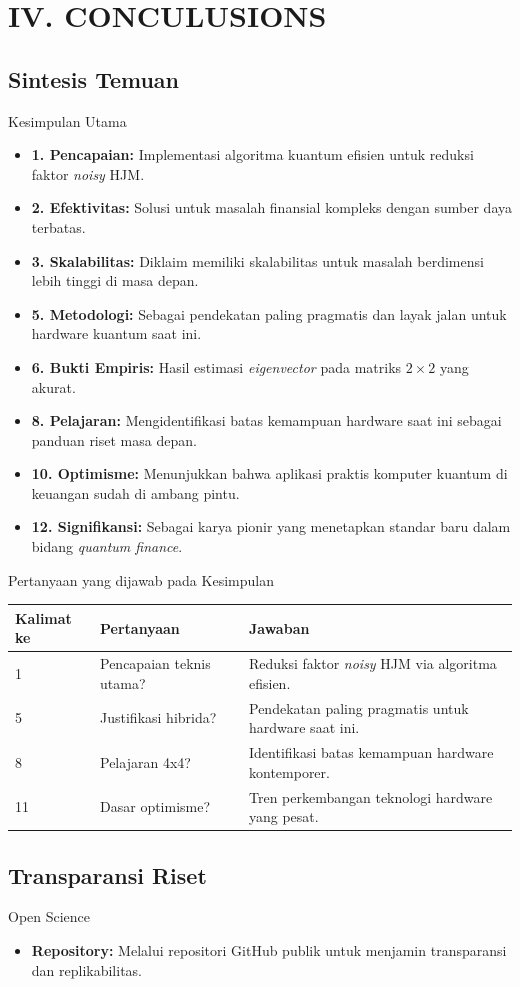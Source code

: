 \section{IV. CONCULUSIONS}

\subsection{Sintesis Temuan}
\begin{frame}{Kesimpulan Utama}
    \begin{itemize}
        \item \textbf{1. Pencapaian:} Implementasi algoritma kuantum efisien untuk reduksi faktor \textit{noisy} HJM.
        \item \textbf{2. Efektivitas:} Solusi untuk masalah finansial kompleks dengan sumber daya terbatas.
        \item \textbf{3. Skalabilitas:} Diklaim memiliki skalabilitas untuk masalah berdimensi lebih tinggi di masa depan.
        \item \textbf{5. Metodologi:} Sebagai pendekatan paling pragmatis dan layak jalan untuk hardware kuantum saat ini.
        \item \textbf{6. Bukti Empiris:} Hasil estimasi \textit{eigenvector} pada matriks $2 \times 2$ yang akurat.
        \item \textbf{8. Pelajaran:} Mengidentifikasi batas kemampuan hardware saat ini sebagai panduan riset masa depan.
        \item \textbf{10. Optimisme:} Menunjukkan bahwa aplikasi praktis komputer kuantum di keuangan sudah di ambang pintu.
        \item \textbf{12. Signifikansi:} Sebagai karya pionir yang menetapkan standar baru dalam bidang \textit{quantum finance}.
    \end{itemize}
\end{frame}

\begin{frame}{Pertanyaan yang dijawab pada Kesimpulan}
    \centering
    \small
    \begin{tabular}{lp{4.5cm}p{6cm}}
        \toprule
        Kalimat ke & Pertanyaan & Jawaban \\
        \midrule
        1 & Pencapaian teknis utama? & Reduksi faktor \textit{noisy} HJM via algoritma efisien. \\
        5 & Justifikasi hibrida? & Pendekatan paling pragmatis untuk hardware saat ini. \\
        8 & Pelajaran 4x4? & Identifikasi batas kemampuan hardware kontemporer. \\
        11 & Dasar optimisme? & Tren perkembangan teknologi hardware yang pesat. \\
        \bottomrule
    \end{tabular}
\end{frame}

\subsection{Transparansi Riset}
\begin{frame}{Open Science}
    \begin{itemize}
        \item \textbf{Repository:} Melalui repositori GitHub publik untuk menjamin transparansi dan replikabilitas.
    \end{itemize}
\end{frame}
